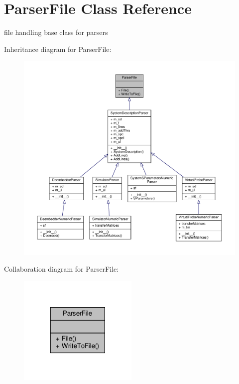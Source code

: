 \hypertarget{classSignalIntegrity_1_1Parsers_1_1ParserFile_1_1ParserFile}{}\section{Parser\+File Class Reference}
\label{classSignalIntegrity_1_1Parsers_1_1ParserFile_1_1ParserFile}


file handling base class for parsers  




Inheritance diagram for Parser\+File\+:
\nopagebreak
\begin{figure}[H]
\begin{center}
\leavevmode
\includegraphics[width=350pt]{classSignalIntegrity_1_1Parsers_1_1ParserFile_1_1ParserFile__inherit__graph}
\end{center}
\end{figure}


Collaboration diagram for Parser\+File\+:
\nopagebreak
\begin{figure}[H]
\begin{center}
\leavevmode
\includegraphics[width=162pt]{classSignalIntegrity_1_1Parsers_1_1ParserFile_1_1ParserFile__coll__graph}
\end{center}
\end{figure}
